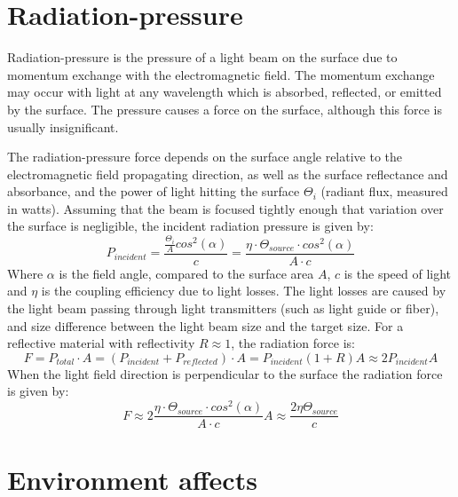 \documentclass[\main/master.tex]{subfiles}
\begin{document}
\section{Radiation-pressure}
Radiation-pressure is the pressure of a light beam on the surface due to momentum exchange with the electromagnetic field. The momentum exchange may occur with light at any wavelength which is absorbed, reflected, or emitted by the surface. The pressure causes a force on the surface, although this force is usually insignificant.  
\par\noindent
The radiation-pressure force depends on the surface angle relative to the electromagnetic field propagating direction, as well as the surface reflectance and absorbance, and the power of light hitting the surface $\Theta_i$ (radiant flux, measured in watts). Assuming that the beam is focused tightly enough that variation over the surface is negligible, the incident radiation pressure is given by:
\begin{equation}
P_{incident} = \frac{\frac{\Theta_i}{A}cos^2(\alpha)}{c} = \frac{\eta\cdot \Theta_{source}\cdot cos^2(\alpha)}{{A\cdot c}} \label{eqn:radiation_pressure}
\end{equation}
Where $\alpha$ is the field angle, compared to the surface area $A$, $c$ is the speed of light and $\eta$ is the coupling efficiency due to light losses. The light losses are caused by the light beam passing through light transmitters (such as light guide or fiber), and size difference between the light beam size and the target size. For a reflective material with reflectivity $R\approx 1$, the radiation force is:
\begin{equation}
F = P_{total}\cdot A = (P_{incident}+P_{reflected})\cdot A = P_{incident}(1+R)A\approx 2P_{incident}A \label{eqn:radiation_force}
\end{equation}
When the light field direction is perpendicular to the surface the radiation force is given by:
\begin{equation}
F \approx   2\frac{\eta\cdot \Theta_{source}\cdot cos^2(\alpha)}{{A\cdot c}}A  \approx\frac{2\eta\Theta_{source}}{{c}} \label{eqn:radiation_force_power}
\end{equation}


\section{Environment affects}
\end{document}
